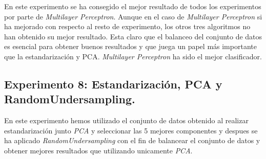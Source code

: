 \documentclass[11pt]{article}
\begin{document}
\begin{table}[H]
	\centering
\end{table}

En este experimento se ha consegido el mejor resultado de todos los experimentos por parte de \textit{Multilayer Perceptron}. Aunque en el caso de \textit{Multilayer Perceptron} si ha mejorado con respecto al resto de experimento, los otros tres algoritmos no han obtenido su mejor resultado. Esta claro que el balanceo del conjunto de datos es esencial para obtener buenos resultados y que juega un papel más importante que la estandarización y PCA. \textit{Multilayer Perceptron} ha sido el mejor clasificador.


\subsection{Experimento 8: Estandarización, PCA y RandomUndersampling.}

En este experimento hemos utilizado el conjunto de datos obtenido al realizar estandarización junto \textit{PCA} y seleccionar las 5 mejores componentes y despues se ha aplicado \textit{RandomUndersampling} con el fin de balancear el conjunto de datos y obtener mejores resultados que utilizando unicamente \textit{PCA}.
\begin{table}[H]
	\centering
\end{table}
\end{document}
